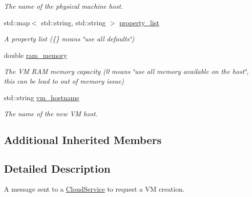 \begin{DoxyCompactItemize}
\begin{DoxyCompactList}\small\item\em The name of the physical machine host. \end{DoxyCompactList}\item 
\mbox{\label{classwrench_1_1_cloud_service_create_v_m_request_message_a2641553429dc07a8162972e44972e755}} 
std\+::map$<$ std\+::string, std\+::string $>$ \hyperlink{classwrench_1_1_cloud_service_create_v_m_request_message_a2641553429dc07a8162972e44972e755}{property\+\_\+list}
\begin{DoxyCompactList}\small\item\em A property list (\{\} means \char`\"{}use all defaults\char`\"{}) \end{DoxyCompactList}\item 
\mbox{\label{classwrench_1_1_cloud_service_create_v_m_request_message_a40ea0674867b318fef39a8ad7f298302}} 
double \hyperlink{classwrench_1_1_cloud_service_create_v_m_request_message_a40ea0674867b318fef39a8ad7f298302}{ram\+\_\+memory}
\begin{DoxyCompactList}\small\item\em The VM R\+AM memory capacity (0 means \char`\"{}use all memory available on the host\char`\"{}, this can be lead to out of memory issue) \end{DoxyCompactList}\item 
\mbox{\label{classwrench_1_1_cloud_service_create_v_m_request_message_ad4fb06a93a8ceb82ababe1f342b2d701}} 
std\+::string \hyperlink{classwrench_1_1_cloud_service_create_v_m_request_message_ad4fb06a93a8ceb82ababe1f342b2d701}{vm\+\_\+hostname}
\begin{DoxyCompactList}\small\item\em The name of the new VM host. \end{DoxyCompactList}\end{DoxyCompactItemize}
\subsection*{Additional Inherited Members}


\subsection{Detailed Description}
A message sent to a \hyperlink{classwrench_1_1_cloud_service}{Cloud\+Service} to request a VM creation. 

